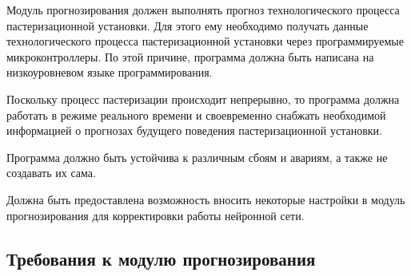 {\cyrillicfont %
\fontsize{13pt}{16.25pt}\selectfont %
\englishfont %

  \par \redline Модуль прогнозирования должен выполнять прогноз технологического процесса пастеризационной установки. Для этого ему необходимо получать данные технологического процесса пастеризационной установки через программируемые микроконтроллеры. По этой причине, программа должна быть написана на низкоуровневом языке программирования. 

  \par \redline Поскольку процесс пастеризации происходит непрерывно, то программа должна работать в режиме реального времени и своевременно снабжать необходимой информацией о прогнозах будущего поведения пастеризационной установки. 

  \par \redline Программа должно быть устойчива к различным сбоям и авариям, а также не создавать их сама. 

  \par \redline Должна быть предоставлена возможность вносить некоторые настройки в модуль прогнозирования для корректировки работы нейронной сети. 

  \par %
}

\titlespace
\subsection*{  \cyrillicfont 
  \fontsize{14pt}{24pt}\selectfont
  \englishfont
  \redline
  Требования к модулю прогнозирования
} 
\titlespace

